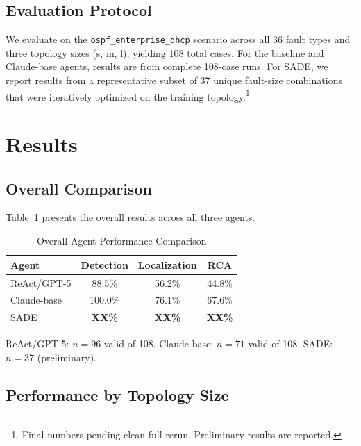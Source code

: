 \documentclass[conference]{IEEEtran}
\begin{document}
\subsection{Evaluation Protocol}

We evaluate on the \texttt{ospf\_enterprise\_dhcp} scenario across all 36 fault types and three topology sizes (s, m, l), yielding 108 total cases. For the baseline and Claude-base agents, results are from complete 108-case runs. For SADE, we report results from a representative subset of 37 unique fault-size combinations that were iteratively optimized on the training topology.\footnote{Final numbers pending clean full rerun. Preliminary results are reported.}

\section{Results}

\subsection{Overall Comparison}

Table~\ref{tab:results} presents the overall results across all three agents.

\begin{table}[t]
\centering
\caption{Overall Agent Performance Comparison}
\label{tab:results}
\begin{tabular}{@{}lccc@{}}
\toprule
\textbf{Agent} & \textbf{Detection} & \textbf{Localization} & \textbf{RCA} \\
\midrule
ReAct/GPT-5 & 88.5\% & 56.2\% & 44.8\% \\
Claude-base & 100.0\% & 76.1\% & 67.6\% \\
SADE & \textbf{XX\%} & \textbf{XX\%} & \textbf{XX\%} \\
\bottomrule
\end{tabular}
\vspace{2pt}
{\footnotesize ReAct/GPT-5: $n=96$ valid of 108. Claude-base: $n=71$ valid of 108. SADE: $n=37$ (preliminary).}
\end{table}

\subsection{Performance by Topology Size}
\end{document}

